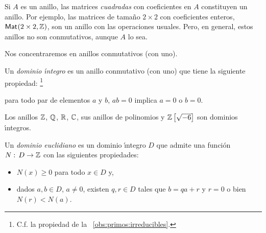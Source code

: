 \begin{ejemEuclidianos}\label{ejem:euclidianos:matrices}
	Si $A$ es un anillo, las matrices \emph{cuadradas} con coeficientes
	en $A$ constituyen un anillo. Por ejemplo, las matrices de tama\~no
	$2\times 2$ con coeficientes enteros, $\mathsf{Mat}_{}(2\times 2,\mathbb{Z})$,
	son un anillo con las operaciones usuales. Pero, en general, estos
	anillos no son conmutativos, aunque $A$ lo sea.
\end{ejemEuclidianos}

Nos concentraremos en anillos conmutativos (con uno).

\begin{defEuclidianos}\label{def:dominio}
	Un \emph{dominio \'{\i}ntegro} es un anillo conmutativo (con uno)
	que tiene la siguiente propiedad:%
	\footnote{
		C.f. la propiedad de la \obsname~\ref{obs:primos:irreducibles}.
	}
	\begin{center}
		para todo par de elementos $a$ y $b$, $ab=0$ implica
			$a=0$ o $b=0$.
	\end{center}
\end{defEuclidianos}

\begin{ejemEuclidianos}\label{ejem:euclidianos:dominio}
	Los anillos $\mathbb{Z}$, $\mathbb{Q}$, $\mathbb{R}$, $\mathbb{C}$,
	sus anillos de polinomios y ${\mathbb{Z}}\left[\sqrt{-6}\right]$ son
	dominios \'{\i}ntegros.
\end{ejemEuclidianos}

\begin{defEuclidianos}\label{def:euclidianos}
	Un \emph{dominio euclidiano} es un dominio \'{\i}ntegro $D$
	que admite una funci\'on $N:\,D\rightarrow\mathbb{Z}$ con las siguientes
	propiedades:
	\begin{itemize}
		\item $N(x)\geq 0$ para todo $x\in D$ y,
		\item dados $a,b\in D$, $a\neq 0$, existen $q,r\in D$ tales
			que $b=qa+r$ y $r=0$ o bien $N(r)<N(a)$.
	\end{itemize}
\end{defEuclidianos}


